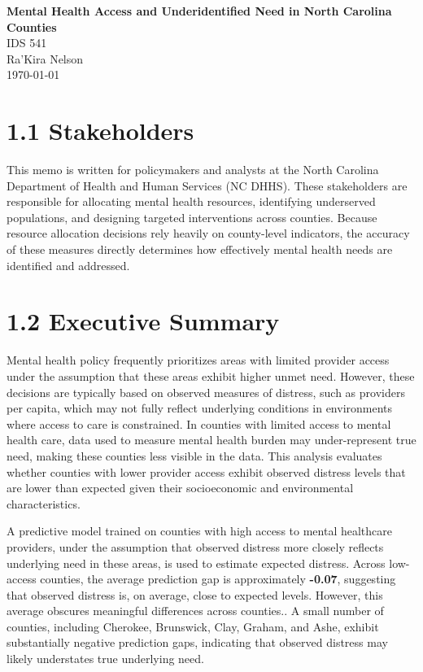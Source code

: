 \documentclass[11pt]{article}
\begin{document}
\begin{center}
\textbf{Mental Health Access and Underidentified Need in North Carolina Counties} \\
IDS 541 \\
Ra'Kira Nelson \\
\today
\end{center}

\section*{1.1 Stakeholders}

This memo is written for policymakers and analysts at the North Carolina Department of Health and Human Services (NC DHHS). These stakeholders are responsible for allocating mental health resources, identifying underserved populations, and designing targeted interventions across counties. Because resource allocation decisions rely heavily on county-level indicators, the accuracy of these measures directly determines how effectively mental health needs are identified and addressed.

\section*{1.2 Executive Summary}

Mental health policy frequently prioritizes areas with limited provider access under the assumption that these areas exhibit higher unmet need. However, these decisions are typically based on observed measures of distress, such as providers per capita, which may not fully reflect underlying conditions in environments where access to care is constrained. In counties with limited access to mental health care, data used to measure mental health burden may under-represent true need, making these counties less visible in the data. This analysis evaluates whether counties with lower provider access exhibit observed distress levels that are lower than expected given their socioeconomic and environmental characteristics. 

A predictive model trained on counties with high access to mental healthcare providers, under the assumption that observed distress more closely reflects underlying need in these areas, is used to estimate expected distress. Across low-access counties, the average prediction gap is approximately \textbf{-0.07}, suggesting that observed distress is, on average, close to expected levels. However, this average obscures meaningful differences across counties.. A small number of counties, including Cherokee, Brunswick, Clay, Graham, and Ashe, exhibit substantially negative prediction gaps, indicating that observed distress may likely understates true underlying need.
\end{document}
